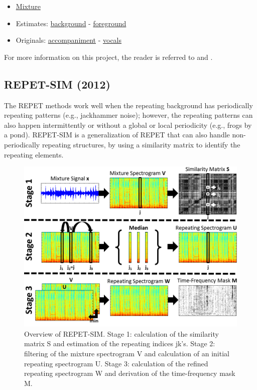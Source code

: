\documentclass{article}
\begin{document}
\begin{itemize}[noitemsep,topsep=0pt]
\item \href{Audio/REPET/dev2__another_dreamer-the_ones_we_love__snip_69_94__mix.wav}{Mixture}
\item Estimates: \href{Audio/REPET/dev2__another_dreamer-the_ones_we_love__snip_69_94__mix_background.wav}{background} - \href{Audio/REPET/dev2__another_dreamer-the_ones_we_love__snip_69_94__mix_foreground.wav}{foreground}
\item Originals: \href{Audio/REPET/dev2__another_dreamer-the_ones_we_love__snip_69_94__mix-vocals.wav}{accompaniment} - \href{Audio/REPET/dev2__another_dreamer-the_ones_we_love__snip_69_94__vocals.wav}{vocals}
\end{itemize}

For more information on this project, the reader is referred to \cite{inproceedings_liutkus_mar2012} and \cite{inbook_rafii_2014}.


\subsection{REPET-SIM (2012)}
\label{ssec:repet_sim}

The REPET methods work well when the repeating background has periodically repeating patterns (e.g., jackhammer noise); however, the repeating patterns can also happen intermittently or without a global or local periodicity (e.g., frogs by a pond). REPET-SIM is a generalization of REPET that can also handle non-periodically repeating structures, by using a similarity matrix to identify the repeating elements.

\begin{figure}[!htb]
\centering
\includegraphics[width=\columnwidth]{Images/repet_sim_overview.png}
\caption{Overview of REPET-SIM. Stage 1: calculation of the similarity matrix S and estimation of the repeating indices jk’s. Stage 2: filtering of the mixture spectrogram V and calculation of an initial repeating spectrogram U. Stage 3: calculation of the refined repeating spectrogram W and derivation of the time-frequency mask M.}
\label{fig:repet_sim_overview}
\end{figure}
\end{document}
